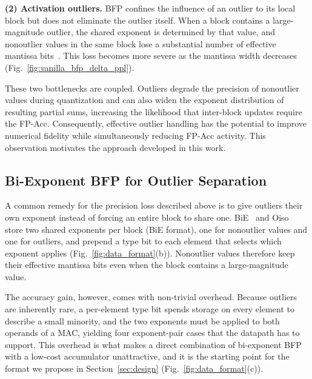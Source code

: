 \textbf{(2) Activation outliers.}
BFP confines the influence of an outlier to its local block but does not eliminate the outlier itself.
When a block contains a large-magnitude outlier, the shared exponent is determined by that value, and nonoutlier values in the same block lose a substantial number of effective mantissa bits~\cite{bie2024,oiso2026,bbal2025,harmonia2026}.
This loss becomes more severe as the mantissa width decreases (Fig.~\ref{fig:vanilla_bfp_delta_ppl}).

These two bottlenecks are coupled.
Outliers degrade the precision of nonoutlier values during quantization and can also widen the exponent distribution of resulting partial sums, increasing the likelihood that inter-block updates require the FP-Acc.
Consequently, effective outlier handling has the potential to improve numerical fidelity while simultaneously reducing FP-Acc activity.
This observation motivates the approach developed in this work.

\subsection{Bi-Exponent BFP for Outlier Separation}
\label{subsec:bie}
A common remedy for the precision loss described above is to give outliers their own exponent instead of forcing an entire block to share one.
BiE~\cite{bie2024} and Oiso~\cite{oiso2026} store two shared exponents per block (BiE format), one for nonoutlier values and one for outliers, and prepend a type bit to each element that selects which exponent applies (Fig.~\ref{fig:data_format}(b)).
Nonoutlier values therefore keep their effective mantissa bits even when the block contains a large-magnitude value.

The accuracy gain, however, comes with non-trivial overhead.
Because outliers are inherently rare, a per-element type bit spends storage on every element to describe a small minority, and the two exponents must be applied to both operands of a MAC, yielding four exponent-pair cases that the datapath has to support.
This overhead is what makes a direct combination of bi-exponent BFP with a low-cost accumulator unattractive, and it is the starting point for the format we propose in Section~\ref{sec:design} (Fig.~\ref{fig:data_format}(c)).
